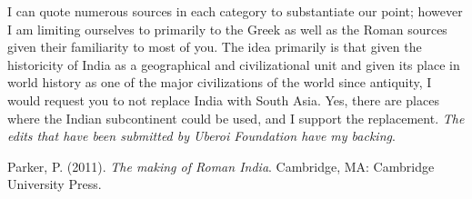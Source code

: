 I can quote numerous sources in each category to substantiate our point; however I am limiting ourselves to primarily to the Greek as well as the Roman sources given their familiarity to most of you. The idea primarily is that given the historicity of India as a geographical and civilizational unit and given its place in world history as one of the major civilizations of the world since antiquity, I would request you to not replace India with South Asia. Yes, there are places where the Indian subcontinent could be used, and I support the replacement. \textit{The edits that have been submitted by Uberoi Foundation have my backing}.

\begin{thebibliography}{99}
 Parker, P. (2011). \textit{The making of Roman India}. Cambridge, MA: Cambridge University Press.
\end{thebibliography}
